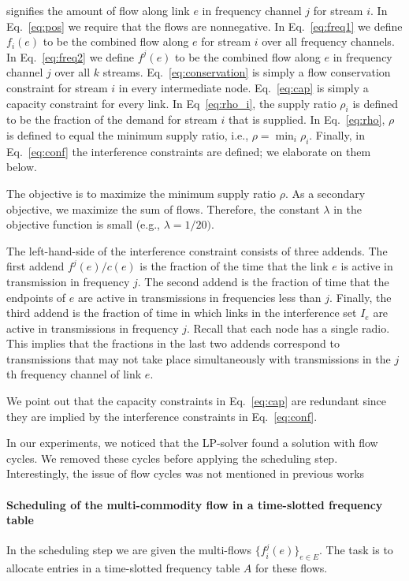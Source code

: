 \documentclass[12pt]{article}
\newenvironment{proof sketch}[1]{\noindent {\emph{Proof sketch of #1:}}}{\hfill \qed}
\begin{document}
signifies the amount of flow along link $e$ in frequency channel $j$
for stream $i$.  In Eq.~\ref{eq:pos} we require that the flows are
nonnegative.  In Eq.~\ref{eq:freq1} we define $f_i(e)$ to be the
combined flow along $e$ for stream $i$ over all frequency channels.  In
Eq.~\ref{eq:freq2} we define $f^j(e)$ to be the combined flow along
$e$ in frequency channel $j$ over all $k$ streams.
Eq.~\ref{eq:conservation} is simply a flow conservation constraint for
stream $i$ in every intermediate node.  Eq.~\ref{eq:cap} is simply a
capacity constraint for every link.  In Eq~\ref{eq:rho_i}, the supply
ratio $\rho_i$ is defined to be the fraction of the demand for stream $i$
that is supplied.  In Eq.~\ref{eq:rho}, $\rho$ is defined to equal the
minimum supply ratio, i.e., $\rho=\min_i \rho_i$.  Finally, in
Eq.~\ref{eq:conf} the interference constraints are defined; we
elaborate on them below.

The objective is to maximize the minimum supply ratio $\rho$.  As a
secondary objective, we maximize the sum of flows.
Therefore, the constant $\lambda$ in the objective function is small
(e.g., $\lambda=1/20)$.

The left-hand-side of the interference constraint consists of three
addends. The first addend $f^j(e)/c(e)$ is the fraction of the time
that the link $e$ is active in transmission in frequency $j$. The
second addend is the fraction of time that the endpoints of $e$ are
active in transmissions in frequencies less than $j$.  Finally, the
third addend is the fraction of time in which links in the
interference set $I_e$ are active in transmissions in frequency $j$.
Recall that each node has a single radio.  This implies that the
fractions in the last two addends correspond to transmissions that may
not take place simultaneously with transmissions in the $j$th
frequency channel of link $e$.

We point out that the capacity constraints in Eq.~\ref{eq:cap} are
redundant since they are implied by the interference constraints in
Eq.~\ref{eq:conf}.

In our experiments, we noticed that the LP-solver found a solution
with flow cycles. We removed these cycles before applying the
scheduling step.  Interestingly, the issue of flow cycles was not
mentioned in previous
works~\cite{alicherry2005joint11,buragohain2007improved}


\paragraph{Scheduling of the multi-commodity flow in a time-slotted
  frequency table}
In the scheduling step we are given the multi-flows
$\{f^j_i(e)\}_{e\in E}$.  The task is to allocate entries in a
time-slotted frequency table $A$ for these flows.
\end{document}
